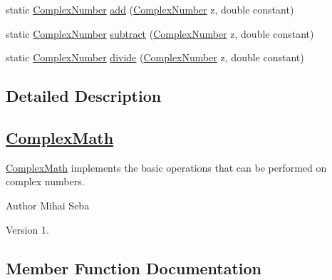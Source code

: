 \begin{DoxyCompactItemize}
\item 
static \hyperlink{classcom_1_1ars_1_1complexnumbers_1_1_complex_number}{Complex\+Number} \hyperlink{classcom_1_1ars_1_1complexnumbers_1_1_complex_math_ac40f506def2684820fa0c85c6672f5a3}{add} (\hyperlink{classcom_1_1ars_1_1complexnumbers_1_1_complex_number}{Complex\+Number} z, double constant)
\item 
static \hyperlink{classcom_1_1ars_1_1complexnumbers_1_1_complex_number}{Complex\+Number} \hyperlink{classcom_1_1ars_1_1complexnumbers_1_1_complex_math_a8ec234a476d41f2f32113eb13a0f7630}{subtract} (\hyperlink{classcom_1_1ars_1_1complexnumbers_1_1_complex_number}{Complex\+Number} z, double constant)
\item 
static \hyperlink{classcom_1_1ars_1_1complexnumbers_1_1_complex_number}{Complex\+Number} \hyperlink{classcom_1_1ars_1_1complexnumbers_1_1_complex_math_aeca04302a95a0a22e5bd7069455aacf6}{divide} (\hyperlink{classcom_1_1ars_1_1complexnumbers_1_1_complex_number}{Complex\+Number} z, double constant)
\end{DoxyCompactItemize}


\subsection{Detailed Description}
\subsection*{\hyperlink{classcom_1_1ars_1_1complexnumbers_1_1_complex_math}{Complex\+Math}}

\hyperlink{classcom_1_1ars_1_1complexnumbers_1_1_complex_math}{Complex\+Math} implements the basic operations that can be performed on complex numbers.

\begin{DoxyAuthor}{Author}
Mihai Seba 
\end{DoxyAuthor}
\begin{DoxyVersion}{Version}
1. 
\end{DoxyVersion}


\subsection{Member Function Documentation}
\hypertarget{classcom_1_1ars_1_1complexnumbers_1_1_complex_math_a5d0a70f5fa36204c59c62f3d63391c25}{}\label{classcom_1_1ars_1_1complexnumbers_1_1_complex_math_a5d0a70f5fa36204c59c62f3d63391c25} 
